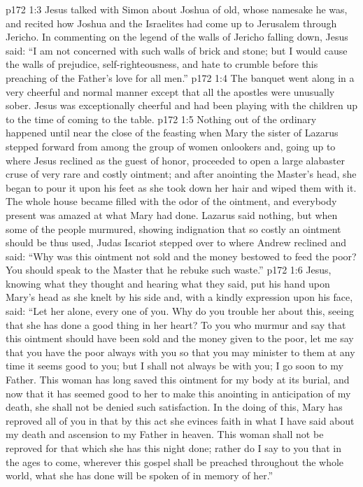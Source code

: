 \vs p172 1:3 Jesus talked with Simon about Joshua of old, whose namesake he was, and recited how Joshua and the Israelites had come up to Jerusalem through Jericho. In commenting on the legend of the walls of Jericho falling down, Jesus said: \textcolor{ubdarkred}{“I am not concerned with such walls of brick and stone; but I would cause the walls of prejudice, self\hyp{}righteousness, and hate to crumble before this preaching of the Father’s love for all men.”}
\vs p172 1:4 The banquet went along in a very cheerful and normal manner except that all the apostles were unusually sober. Jesus was exceptionally cheerful and had been playing with the children up to the time of coming to the table.
\pc \vs p172 1:5 Nothing out of the ordinary happened until near the close of the feasting when Mary the sister of Lazarus stepped forward from among the group of women onlookers and, going up to where Jesus reclined as the guest of honor, proceeded to open a large alabaster cruse of very rare and costly ointment; and after anointing the Master’s head, she began to pour it upon his feet as she took down her hair and wiped them with it. The whole house became filled with the odor of the ointment, and everybody present was amazed at what Mary had done. Lazarus said nothing, but when some of the people murmured, showing indignation that so costly an ointment should be thus used, Judas Iscariot stepped over to where Andrew reclined and said: “Why was this ointment not sold and the money bestowed to feed the poor? You should speak to the Master that he rebuke such waste.”
\vs p172 1:6 Jesus, knowing what they thought and hearing what they said, put his hand upon Mary’s head as she knelt by his side and, with a kindly expression upon his face, said: \textcolor{ubdarkred}{“Let her alone, every one of you. Why do you trouble her about this, seeing that she has done a good thing in her heart? To you who murmur and say that this ointment should have been sold and the money given to the poor, let me say that you have the poor always with you so that you may minister to them at any time it seems good to you; but I shall not always be with you; I go soon to my Father. This woman has long saved this ointment for my body at its burial, and now that it has seemed good to her to make this anointing in anticipation of my death, she shall not be denied such satisfaction. In the doing of this, Mary has reproved all of you in that by this act she evinces faith in what I have said about my death and ascension to my Father in heaven. This woman shall not be reproved for that which she has this night done; rather do I say to you that in the ages to come, wherever this gospel shall be preached throughout the whole world, what she has done will be spoken of in memory of her.”}
